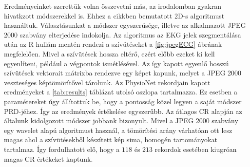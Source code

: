 \documentclass[oneside,titlepage,12pt,a4paper]{report}
\begin{document}
Eredményeinket szerettük volna összevetni más, az irodalomban gyakran hivatkzott módszerekkel is. Ehhez a \cite{jpeg2000ECG} cikkben bemutatott 2D-s algoritmust használtuk. Választásunkat a módszer egyszerűsége, illetve az alkalmazott JPEG 2000 szabvány elterjedése indokolja. Az algoritmus az EKG jelek szegmentálása után az R hullám mentén rendezi a szívütéseket a \ref{fig:jpegECG} ábrának megfelelően. Mivel a szívütések hossza eltérő, ezért előbb ezeket ki kell egyenlíteni, például a végpontok ismétlésével. Az így kapott egyenlő hosszú szívütések vektorait mátrixba rendezve egy képet kapunk, melyet a JPEG 2000 veszteséges képtömörítővel tárolunk. Az PhysioNet rekordjain kapott eredményeket a \ref{tab:results} táblázat utolsó oszlopa tartalmazza. Ez esetben a paramétereket úgy állítottuk be, hogy a pontosság közel legyen a saját módszer PRD-jéhez. Így az eredmények értékelése egyszerűbb. Az átlagos CR alapján az általunk kidolgozott módszer jobbank bizonyult. Mivel a JPEG 2000 szabvány egy wavelet alapú algoritmust használ, a tömörítési arány várhatóan ott lesz magas ahol a szívütésekből készített kép sima, homogén tartományokat tartalmaz. Így fordulhatott elő, hogy a $118$ és $213$ rekordok esetében kiugróan magas CR értékeket kaptunk.
\end{document}

